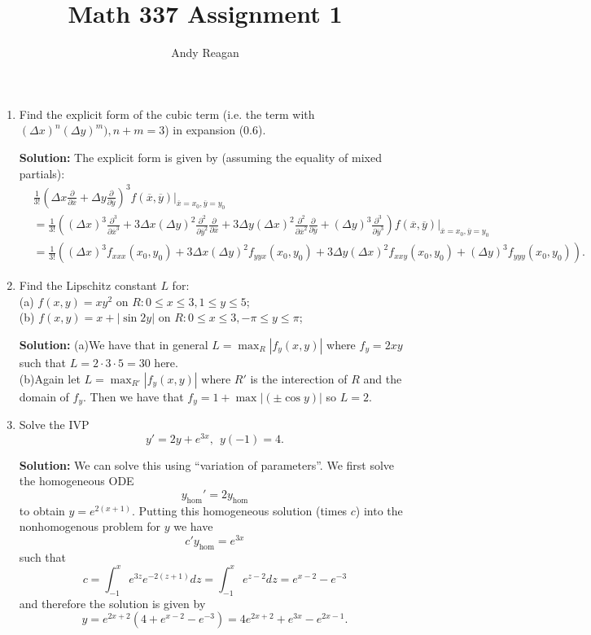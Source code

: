 \documentclass[11pt]{article}
\author{Andy Reagan}
\title{Math 337 Assignment 1}
\def\f{\frac }
\newcommand{\pdiff}[2]{\frac{\partial #1}{\partial #2}}
\newcommand{\pdiffsq}[2]{\frac{\partial^2 #1}{{\partial #2}^2}}
\newcommand{\pdiffcu}[2]{\frac{\partial^3 #1}{{\partial #2}^3}}
\begin{document}
\maketitle
\begin{enumerate}

\item Find the explicit form of the cubic term (i.e. the term with $(\Delta x)^n (\Delta y )^m ), n+m = 3$) in expansion (0.6).

{\bf Solution:} The explicit form is given by (assuming the equality of mixed partials):
\begin{align*} & \f{1}{3!} \left ( \Delta x \pdiff{}{\overline{x}} + \Delta y \pdiff{}{\overline{y}} \right ) ^3 \left. f(\overline{x},\overline{y} ) \right | _{\overline{x}=x_0,\overline{y} = y_0} \\
& = \f{1}{3!} \left ( (\Delta x)^3 \pdiffcu{}{\overline{x}} + 3\Delta x (\Delta y)^2 \pdiffsq{}{\overline{y}} \pdiff{}{\overline{x}} + 3\Delta y (\Delta x)^2 \pdiffsq{}{\overline{x}} \pdiff{}{\overline{y}} + (\Delta y)^3 \pdiffcu{}{\overline{y}} \right ) \left. f(\overline{x},\overline{y} ) \right | _{\overline{x}=x_0,\overline{y} = y_0} \\
& = \f{1}{3!} \left ( (\Delta x)^3 f_{xxx} (x_0,y_0) + 3\Delta x (\Delta y)^2 f_{yyx} (x_0,y_0) + 3\Delta y (\Delta x)^2 f_{xxy}(x_0,y_0) + (\Delta y)^3 f_{yyy}(x_0,y_0) \right )  .\end{align*}

\item Find the Lipschitz constant $L$ for:\\
(a) $f(x,y) = xy^2$ on $R: 0 \leq x \leq 3, 1\leq y \leq 5$;\\
(b) $f(x,y) = x + |\sin 2y |$ on $R: 0 \leq x \leq 3, -\pi\leq y \leq \pi$;

{\bf Solution:} (a)We have that in general $L = \max _R | f_y (x,y) |$ where $f_y = 2xy$ such that $L = 2\cdot 3\cdot 5 = 30$ here.\\
(b)Again let $L = \max _{R'} | f_y (x,y) |$ where $R'$ is the interection of $R$ and the domain of $f_y$.
Then we have that $f_y = 1 + \max | (\pm \cos y) |$ so $L = 2$.

\item Solve the IVP \[ y' = 2y + e^{3x} , ~~ y(-1) = 4 .\]

{\bf Solution:} We can solve this using ``variation of parameters''.
We first solve the homogeneous ODE
\[ y_\text{hom}' = 2 y_\text{hom} \]
to obtain $y = e^{2(x+1)}$. Putting this homogeneous solution (times $c$) into the nonhomogenous problem for $y$ we have
\[ c'y_\text{hom} = e^{3x} \]
such that
\[ c = \int _{-1} ^x e^{3z} e^{-2(z+1)} dz = \int _{-1} ^x e^{z-2} dz  = e^{x-2} - e^{-3}\]
and therefore the solution is given by
\[ y = e^{2x+2} \left ( 4  + e^{x-2} - e^{-3} \right ) = 4e^{2x+2}  + e^{3x} - e^{2x-1}. \]


\end{enumerate}
\end{document}
